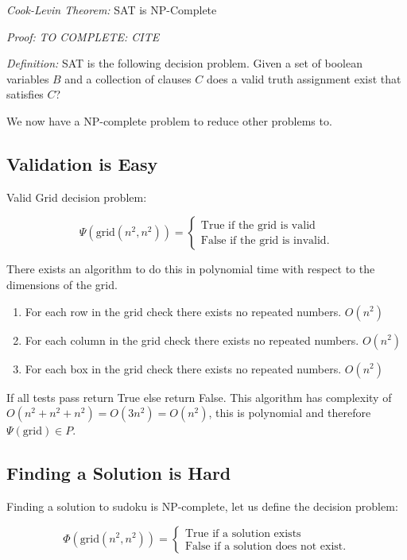 \documentclass[a4paper,12pt]{article}
\begin{document}
\textit{Cook-Levin Theorem:} SAT is NP-Complete
	
\textit{Proof:}	 \textit{TO COMPLETE: CITE }

\textit{Definition: } SAT is the following decision problem. Given a set of boolean variables $B$ and a collection of clauses $C$ does a valid truth assignment exist that satisfies $C$?

We now have a NP-complete problem to reduce other problems to.

	\subsection{Validation is Easy}
Valid Grid decision problem:

		\begin{equation}
			\Psi(\text{grid}(n^2,n^2)) = \begin{cases}	
							     \text{True if the grid is valid} \\
							     \text{False if the grid is invalid}.
							     \end{cases}
		\end{equation}

There exists an algorithm to do this in polynomial time with respect to the dimensions of the grid. 
\begin{enumerate}
\item For each row in the grid check there exists no repeated numbers. $O(n^2)$
\item For each column in the grid check there exists no repeated numbers. $O(n^2)$
\item For each box in the grid check there exists no repeated numbers. $O(n^2)$
\end{enumerate}
If all tests pass return True else return False.
This algorithm has complexity of $O(n^2 + n^2 + n^2) = O(3n^2) = O(n^2)$, this is polynomial and therefore $\Psi(\text{grid}) \in P$.

	\subsection{Finding a Solution is Hard}
		
Finding a solution to sudoku is NP-complete, let us define the decision problem:

		\begin{equation}
		        \Phi (\text{grid}(n^2,n^2)) = \begin{cases}
		            \text{True if a solution exists} \\
		            \text{False if a solution does not exist}.
				\end{cases}
		\end{equation}
\end{document}

